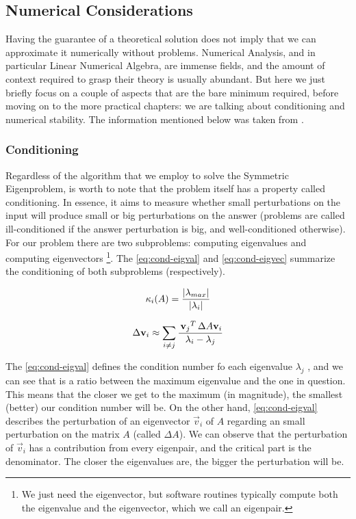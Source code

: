 \subsection{Numerical Considerations}

Having the guarantee of a theoretical solution does not imply that we
can approximate it numerically without problems. Numerical Analysis,
and in particular Linear Numerical 
Algebra, are immense fields, and the amount of context required to grasp
their theory is usually abundant. But here we just briefly focus on a couple of
aspects that are the bare minimum required, before moving on to the more
practical chapters: we are talking about conditioning and numerical
stability. The information mentioned below was taken from
\cite{bindel09}. \\ 

\subsubsection{Conditioning}
Regardless of the algorithm that we employ to solve the Symmetric
Eigenproblem, is worth to note that the problem itself has a property
called conditioning. In essence, it aims to measure whether small
perturbations on the input will produce small or big perturbations on the
answer (problems are called ill-conditioned if the answer perturbation
is big, and well-conditioned otherwise). For our problem there are two subproblems:
computing eigenvalues and computing eigenvectors \footnote{We
just need the eigenvector, but software routines typically compute both the
eigenvalue and the eigenvector, which we call an eigenpair.}. The
\cref{eq:cond-eigval} and \cref{eq:cond-eigvec} summarize the
conditioning of both subproblems (respectively).

\begin{equation}
  \label{eq:cond-eigval}
  \kappa_{i}(A) = \dfrac{\left\lvert \lambda_{max} \right\vert}{\left\lvert \lambda_i \right\vert}
\end{equation}

\begin{equation}
  \label{eq:cond-eigvec}
  \Delta \mathbf{v}_i \approx \sum\limits_{\tiny{i \ne j}}
  \dfrac{\,{\mathbf{v}_j}^{T}\, \Delta A \mathbf{v}_i}{\lambda_i - \lambda_j}  
\end{equation}
\joinbelow{1cm}

The \cref{eq:cond-eigval} defines the condition number fo each
eigenvalue $\lambda_j$ , and we can see that is a ratio between the maximum
eigenvalue and the one in question. This means that the closer we get
to the maximum (in magnitude), the smallest (better) our condition number will be. On
the other hand, \cref{eq:cond-eigval} describes the perturbation of an
eigenvector $\vec{v}_i$ of $A$ regarding an small perturbation on the
matrix $A$ (called $\Delta A$). We can observe that the perturbation of
$\vec{v}_i$ has a 
contribution from every eigenpair, and the critical part is the
denominator. The closer the eigenvalues are, the bigger the
perturbation will be. \\

